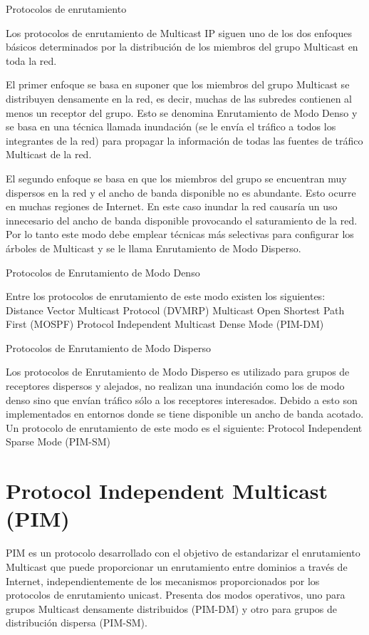 \documentclass[12pt,a4paper,oneside]{book}
\begin{document}
 Protocolos de enrutamiento

Los protocolos de enrutamiento de Multicast IP siguen uno de los dos enfoques básicos determinados por la distribución de los miembros del grupo Multicast en toda la red.

El primer enfoque se basa en suponer que los miembros del grupo Multicast se distribuyen densamente en la red, es decir, muchas de las subredes contienen al menos un receptor del grupo. Esto se denomina Enrutamiento de Modo Denso y se basa en una técnica llamada inundación (se le envía el tráfico a todos los integrantes de la red) para propagar la información de todas las fuentes de tráfico Multicast de la red.
	
El segundo enfoque se basa en que los miembros del grupo se encuentran muy dispersos en la red y el ancho de banda disponible no es abundante. Esto ocurre en muchas regiones de Internet. En este caso inundar la red causaría un uso innecesario del ancho de banda disponible provocando el saturamiento de la red. Por lo tanto este modo debe emplear técnicas más selectivas para configurar los árboles de Multicast y se le llama Enrutamiento de Modo Disperso.


Protocolos de Enrutamiento de Modo Denso
	
Entre los protocolos de enrutamiento de este modo existen los siguientes:
Distance Vector Multicast Protocol (DVMRP)
Multicast Open Shortest Path First (MOSPF)
Protocol Independent Multicast Dense Mode (PIM-DM)


Protocolos de Enrutamiento de Modo Disperso
	
Los protocolos de Enrutamiento de Modo Disperso es utilizado para grupos de receptores dispersos y alejados, no realizan una inundación como los de modo denso sino que envían tráfico sólo a los receptores interesados. Debido a esto son implementados en entornos donde se tiene disponible un ancho de banda acotado. Un protocolo de enrutamiento de este modo es el siguiente:
Protocol Independent Sparse Mode (PIM-SM)


\section{Protocol Independent Multicast (PIM)}
\label{marco_pim}
PIM es un protocolo desarrollado con el objetivo de estandarizar el enrutamiento Multicast que puede proporcionar un enrutamiento entre dominios a través de Internet, independientemente de los mecanismos proporcionados por los protocolos de enrutamiento unicast. Presenta dos modos operativos, uno para grupos Multicast densamente distribuidos (PIM-DM) y otro para grupos de distribución dispersa (PIM-SM).
\end{document}
